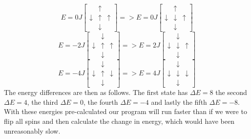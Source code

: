 \documentclass{emulateapj}
\begin{document}
%
%
\begin{equation*}
    E = 0J
    \begin{bmatrix}
        & \uparrow &  \\
        \downarrow & \uparrow & \uparrow \\
         & \downarrow &
    \end{bmatrix}
    =>
    E = 0J
    \begin{bmatrix}
        & \uparrow &  \\
        \downarrow & \downarrow & \uparrow \\
         & \downarrow &
    \end{bmatrix}
\end{equation*}
%
%
\begin{equation*}
    E = -2J
    \begin{bmatrix}
        & \downarrow &  \\
        \downarrow & \uparrow & \uparrow \\
         & \downarrow &
    \end{bmatrix}
    =>
    E = 2J
    \begin{bmatrix}
        & \downarrow &  \\
        \downarrow & \downarrow & \uparrow \\
         & \downarrow &
    \end{bmatrix}
\end{equation*}
%
%
\begin{equation*}
    E = -4J
    \begin{bmatrix}
        & \downarrow &  \\
        \downarrow & \uparrow & \downarrow \\
         & \downarrow &
    \end{bmatrix}
    =>
    E = 4J
    \begin{bmatrix}
        & \downarrow &  \\
        \downarrow & \downarrow & \downarrow \\
         & \downarrow &
    \end{bmatrix}
\end{equation*}
%
The energy differences are then as follows. The first state has $\Delta E = 8$ the second $\Delta E = 4$, the third $\Delta E = 0$, the fourth $\Delta E = -4$ and lastly the fifth $\Delta E = -8$. With these energies pre-calculated our program will run faster than if we were to flip all spins and then calculate the change in energy, which would have been unreasonably slow.
%
\end{document}
